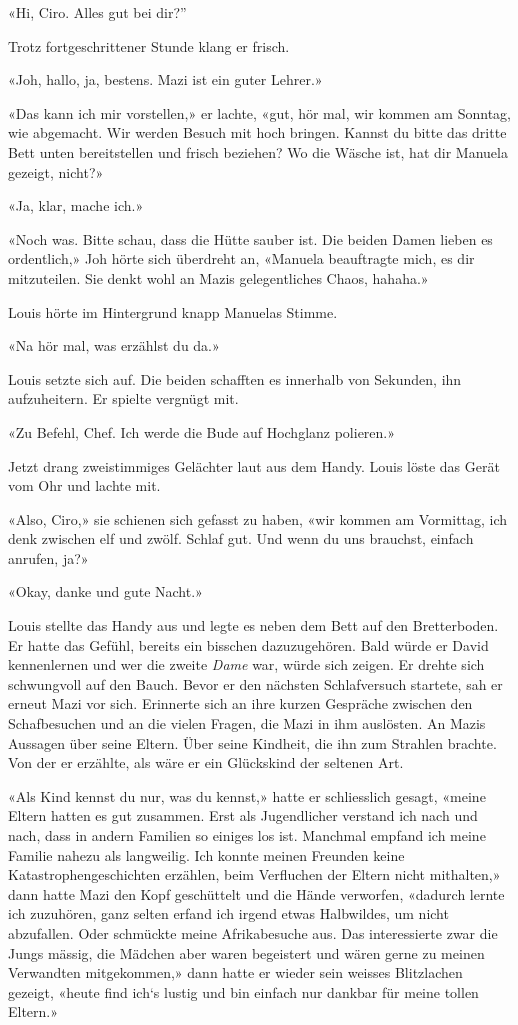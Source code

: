 «Hi, Ciro. Alles gut bei dir?''

Trotz fortgeschrittener Stunde klang er frisch.

«Joh, hallo, ja, bestens. Mazi ist ein guter Lehrer.»

«Das kann ich mir vorstellen,» er lachte, «gut, hör mal, wir kommen am
Sonntag, wie abgemacht. Wir werden Besuch mit hoch bringen. Kannst du
bitte das dritte Bett unten bereitstellen und frisch beziehen? Wo die
Wäsche ist, hat dir Manuela gezeigt, nicht?»

«Ja, klar, mache ich.»

«Noch was. Bitte schau, dass die Hütte sauber ist. Die beiden Damen
lieben es ordentlich,» Joh hörte sich überdreht an, «Manuela beauftragte
mich, es dir mitzuteilen. Sie denkt wohl an Mazis gelegentliches Chaos,
hahaha.»

Louis hörte im Hintergrund knapp Manuelas Stimme.

«Na hör mal, was erzählst du da.»

Louis setzte sich auf. Die beiden schafften es innerhalb von Sekunden,
ihn aufzuheitern. Er spielte vergnügt mit.

«Zu Befehl, Chef. Ich werde die Bude auf Hochglanz polieren.»

Jetzt drang zweistimmiges Gelächter laut aus dem Handy. Louis löste das
Gerät vom Ohr und lachte mit.

«Also, Ciro,» sie schienen sich gefasst zu haben, «wir kommen am
Vormittag, ich denk zwischen elf und zwölf. Schlaf gut. Und wenn du uns
brauchst, einfach anrufen, ja?»

«Okay, danke und gute Nacht.»

Louis stellte das Handy aus und legte es neben dem Bett auf den
Bretterboden. Er hatte das Gefühl, bereits ein bisschen dazuzugehören.
Bald würde er David kennenlernen und wer die zweite \emph{Dame} war,
würde sich zeigen. Er drehte sich schwungvoll auf den Bauch. Bevor er
den nächsten Schlafversuch startete, sah er erneut Mazi vor sich.
Erinnerte sich an ihre kurzen Gespräche zwischen den Schafbesuchen und
an die vielen Fragen, die Mazi in ihm auslösten. An Mazis Aussagen über
seine Eltern. Über seine Kindheit, die ihn zum Strahlen brachte. Von der
er erzählte, als wäre er ein Glückskind der seltenen Art.

«Als Kind kennst du nur, was du kennst,» hatte er schliesslich gesagt,
«meine Eltern hatten es gut zusammen. Erst als Jugendlicher verstand ich
nach und nach, dass in andern Familien so einiges los ist. Manchmal
empfand ich meine Familie nahezu als langweilig. Ich konnte meinen
Freunden keine Katastrophengeschichten erzählen, beim Verfluchen der
Eltern nicht mithalten,» dann hatte Mazi den Kopf geschüttelt und die
Hände verworfen, «dadurch lernte ich zuzuhören, ganz selten erfand ich
irgend etwas Halbwildes, um nicht abzufallen. Oder schmückte meine
Afrikabesuche aus. Das interessierte zwar die Jungs mässig, die Mädchen
aber waren begeistert und wären gerne zu meinen Verwandten mitgekommen,»
dann hatte er wieder sein weisses Blitzlachen gezeigt, «heute find ich`s
lustig und bin einfach nur dankbar für meine tollen Eltern.»

